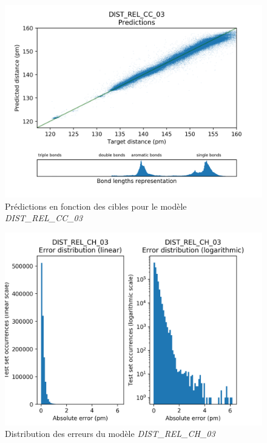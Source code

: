 \begin{figure}[!h]
	\centering
	
	\includegraphics[scale=0.8]{../figures/DIST_REL_CC_03/DIST_REL_CC_03_preds_targets.png}	
	
	\caption{Prédictions en fonction des cibles pour le modèle \emph{DIST\_REL\_CC\_03}}
	
\end{figure}


\begin{figure}[!h]
	\centering
	
	\includegraphics[scale=0.8]{../figures/DIST_REL_CH_03/DIST_REL_CH_03_distrib_rmse_val.png}	
	
	\caption{Distribution des erreurs du modèle \emph{DIST\_REL\_CH\_03}}
\end{figure}

